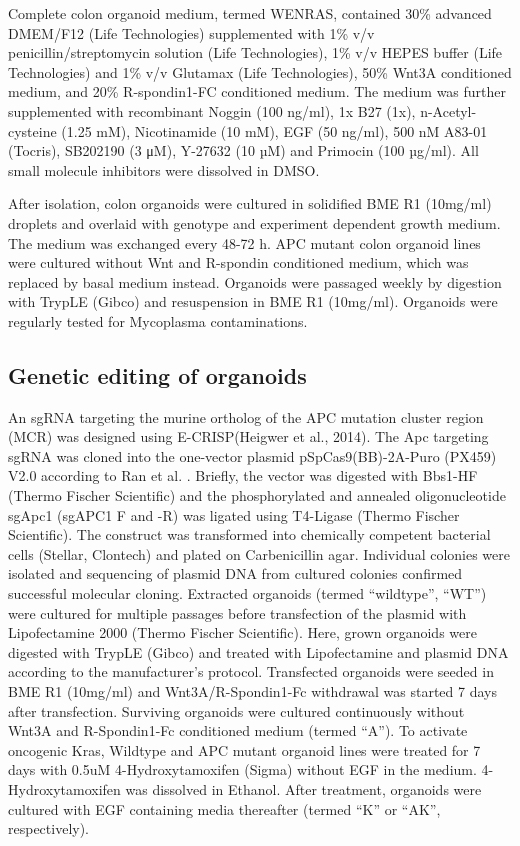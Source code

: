 \begin{flushleft}
Complete colon organoid medium, termed WENRAS, contained 30\% advanced DMEM/F12 (Life Technologies) supplemented with 1\% v/v penicillin/streptomycin solution (Life Technologies), 1\% v/v HEPES buffer (Life Technologies) and 1\% v/v Glutamax (Life Technologies), 50\% Wnt3A conditioned medium, and 20\% R-spondin1-FC conditioned medium. 
The medium was further supplemented with recombinant Noggin (100 ng/ml), 1x B27 (1x), n-Acetyl-cysteine (1.25 mM), Nicotinamide (10 mM), EGF (50 ng/ml), 500 nM A83-01 (Tocris), SB202190 (3 μM), Y-27632 (10 µM) and Primocin (100 µg/ml). All small molecule inhibitors were dissolved in DMSO. 

After isolation, colon organoids were cultured in solidified BME R1 (10mg/ml) droplets and overlaid with genotype and experiment dependent growth medium. The medium was exchanged every 48-72 h. 
APC mutant colon organoid lines were cultured without Wnt and R-spondin conditioned medium, which was replaced by basal medium instead.
Organoids were passaged weekly by digestion with TrypLE (Gibco) and resuspension in BME R1 (10mg/ml). 
Organoids were regularly tested for Mycoplasma contaminations.  

\subsection{Genetic editing of organoids}
An sgRNA targeting the murine ortholog of the APC mutation cluster region (MCR) was designed using E-CRISP(Heigwer et al., 2014). The Apc targeting sgRNA was cloned into the one-vector plasmid pSpCas9(BB)-2A-Puro (PX459) V2.0 according to Ran et al. \cite{Ran2013}. Briefly, the vector was digested with Bbs1-HF (Thermo Fischer Scientific) and the phosphorylated and annealed oligonucleotide sgApc1 (sgAPC1 F and -R) was ligated using T4-Ligase (Thermo Fischer Scientific). The construct was transformed into chemically competent bacterial cells (Stellar, Clontech) and plated on Carbenicillin agar. Individual colonies were isolated and sequencing of plasmid DNA from cultured colonies confirmed successful molecular cloning.   
Extracted organoids (termed “wildtype”, “WT”) were cultured for multiple passages before transfection of the plasmid with Lipofectamine 2000 (Thermo Fischer Scientific). Here, grown organoids were digested with TrypLE (Gibco) and treated with Lipofectamine and plasmid DNA according to the manufacturer’s protocol. Transfected organoids were seeded in BME R1 (10mg/ml) and Wnt3A/R-Spondin1-Fc withdrawal was started 7 days after transfection. Surviving organoids were cultured continuously without Wnt3A and R-Spondin1-Fc conditioned medium (termed “A”).
To activate oncogenic Kras, Wildtype and APC mutant organoid lines were treated for 7 days with 0.5uM 4-Hydroxytamoxifen (Sigma) without EGF in the medium. 4-Hydroxytamoxifen was dissolved in Ethanol. After treatment, organoids were cultured with EGF containing media thereafter (termed “K” or “AK”, respectively).


\end{flushleft}
